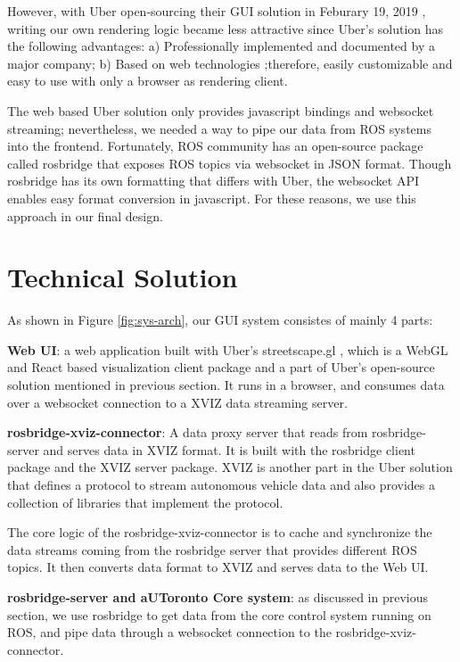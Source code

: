 \documentclass{article}
\begin{document}
However, with Uber open-sourcing their GUI solution in Feburary 19, 2019 \cite{ubernews}, writing our own rendering logic became less attractive since Uber's solution has the following advantages: a) Professionally implemented and documented by a major company; b) Based on web technologies ;therefore,  easily customizable and easy to use with only a browser as rendering client.

The web based Uber solution only provides javascript bindings and websocket streaming; nevertheless, we needed a way to pipe our data from ROS systems into the frontend. Fortunately,  ROS community has an open-source package called rosbridge \cite{rosbridge} that exposes ROS topics via websocket in JSON format. Though rosbridge has its own formatting that differs with Uber, the websocket API enables easy format conversion in javascript. For these reasons, we use this approach in our final design.

\section{Technical Solution}

As shown in Figure \ref{fig:sys-arch}, our GUI system consistes of mainly 4 parts:

\textbf{Web UI}: a web application built with Uber's streetscape.gl \cite{streetscapegl}, which is a WebGL and React based visualization client package and a part of Uber's open-source solution mentioned in previous section. It runs in a browser, and consumes data over a websocket connection to a XVIZ data streaming server. 

\textbf{rosbridge-xviz-connector}: A data proxy server that reads from rosbridge-server and serves data in XVIZ format. It is built with the rosbridge client package and the XVIZ server package. XVIZ is another part in the Uber solution that defines a protocol to stream autonomous vehicle data and also provides a collection of libraries that implement the protocol.

The core logic of the rosbridge-xviz-connector is to cache and synchronize the data streams coming from the rosbridge server that provides different ROS topics. It then converts data format to XVIZ and serves data to the Web UI.

\textbf{rosbridge-server and aUToronto Core system}: as discussed in previous section, we use rosbridge to get data from the core control system running on ROS, and pipe data through a websocket connection to the rosbridge-xviz-connector.
\end{document}
